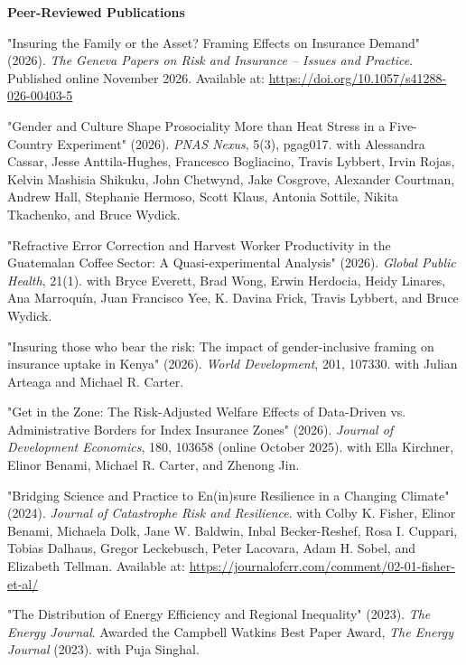 \documentclass[11pt,letterpaper]{article}
\newcommand{\horse}{5pt} 	%
\newcommand{\littlehorse}{5pt}%
\newenvironment{itemize*}%
  {\begin{itemize}[topsep=0pt, partopsep=0pt, leftmargin=1.6em, itemindent=-1.6em, labelsep=0pt, labelwidth=0pt]%
    \setlength{\itemsep}{\littlehorse}%
    \setlength{\parskip}{0pt}%
    \interlinepenalty=10000}%
  {\end{itemize}\vspace{\horse}}
\newcommand{\resheading}[1]{%
  \vspace{6pt}%
  {\textbf{\large #1}}%
  \par\vspace{4pt}}
\begin{document}
\resheading{Peer-Reviewed Publications}
\begin{itemize*}

  \item[]{"Insuring the Family or the Asset? Framing Effects on Insurance Demand" (2026).  \textit{The Geneva Papers on Risk and Insurance -- Issues and Practice}. Published online November 2026. Available at: \url{https://doi.org/10.1057/s41288-026-00403-5}}

  \item[]{"Gender and Culture Shape Prosociality More than Heat Stress in a Five-Country Experiment" (2026).  \textit{PNAS Nexus}, 5(3), pgag017. with Alessandra Cassar, Jesse Anttila-Hughes, Francesco Bogliacino, Travis Lybbert, Irvin Rojas, Kelvin Mashisia Shikuku, John Chetwynd, Jake Cosgrove, Alexander Courtman, Andrew Hall, Stephanie Hermoso, Scott Klaus, Antonia Sottile, Nikita Tkachenko, and Bruce Wydick.}

  \item[]{"Refractive Error Correction and Harvest Worker Productivity in the Guatemalan Coffee Sector: A Quasi-experimental Analysis" (2026).  \textit{Global Public Health}, 21(1). with Bryce Everett, Brad Wong, Erwin Herdocia, Heidy Linares, Ana Marroquín, Juan Francisco Yee, K. Davina Frick, Travis Lybbert, and Bruce Wydick.}

  \item[]{"Insuring those who bear the risk: The impact of gender-inclusive framing on insurance uptake in Kenya" (2026).  \textit{World Development}, 201, 107330. with Julian Arteaga and Michael R. Carter.}

  \item[]{"Get in the Zone: The Risk-Adjusted Welfare Effects of Data-Driven vs. Administrative Borders for Index Insurance Zones" (2026).  \textit{Journal of Development Economics}, 180, 103658 (online October 2025). with Ella Kirchner, Elinor Benami, Michael R. Carter, and Zhenong Jin.}

  \item[]{"Bridging Science and Practice to En(in)sure Resilience in a Changing Climate" (2024).  \textit{Journal of Catastrophe Risk and Resilience}. with Colby K. Fisher, Elinor Benami, Michaela Dolk, Jane W. Baldwin, Inbal Becker-Reshef, Rosa I. Cuppari, Tobias Dalhaus, Gregor Leckebusch, Peter Lacovara, Adam H. Sobel, and Elizabeth Tellman. Available at: \url{https://journalofcrr.com/comment/02-01-fisher-et-al/}}

  \item[]{"The Distribution of Energy Efficiency and Regional Inequality" (2023).  \textit{The Energy Journal}. Awarded the Campbell Watkins Best Paper Award, \textit{The Energy Journal} (2023). with Puja Singhal.}


\end{itemize*}
\end{document}
